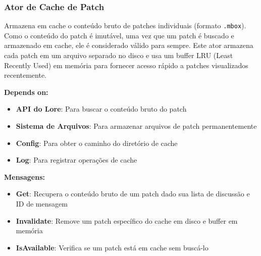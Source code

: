 \subsubsection{Ator de Cache de Patch}

Armazena em cache o conteúdo bruto de patches individuais (formato \texttt{.mbox}). Como o conteúdo do patch é imutável, uma vez que um patch é buscado e armazenado em cache, ele é considerado válido para sempre. Este ator armazena cada patch em um arquivo separado no disco e usa um buffer LRU (Least Recently Used) em memória para fornecer acesso rápido a patches visualizados recentemente.

\textbf{Depends on:}

\begin{itemize}
    \item \textbf{API do Lore}: Para buscar o conteúdo bruto do patch
    \item \textbf{Sistema de Arquivos}: Para armazenar arquivos de patch permanentemente
    \item \textbf{Config}: Para obter o caminho do diretório de cache
    \item \textbf{Log}: Para registrar operações de cache
\end{itemize}

\textbf{Mensagens:}

\begin{itemize}
    \item \textbf{Get}: Recupera o conteúdo bruto de um patch dado sua lista de discussão e ID de mensagem
    \item \textbf{Invalidate}: Remove um patch específico do cache em disco e buffer em memória
    \item \textbf{IsAvailable}: Verifica se um patch está em cache sem buscá-lo
\end{itemize}
